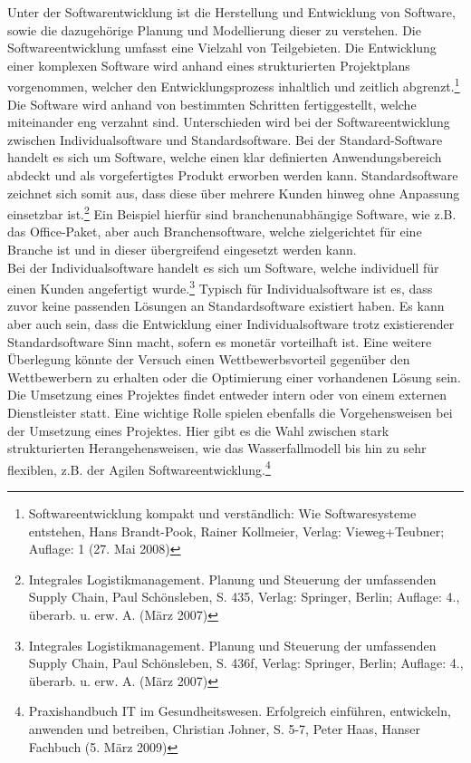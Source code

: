 Unter der Softwarentwicklung ist die Herstellung und Entwicklung von Software, sowie die dazugehörige Planung und Modellierung dieser zu verstehen.
Die Softwareentwicklung umfasst eine Vielzahl von Teilgebieten.
Die Entwicklung einer komplexen Software wird anhand eines strukturierten Projektplans vorgenommen, welcher den Entwicklungsprozess inhaltlich und zeitlich abgrenzt.\footnote{Softwareentwicklung kompakt und verständlich: Wie Softwaresysteme entstehen, Hans Brandt-Pook, Rainer Kollmeier, Verlag: Vieweg+Teubner; Auflage: 1 (27. Mai 2008)}
Die Software wird anhand von bestimmten Schritten fertiggestellt, welche miteinander eng verzahnt sind.
Unterschieden wird bei der Softwareentwicklung zwischen Individualsoftware und Standardsoftware.
Bei der Standard-Software handelt es sich um Software, welche einen klar definierten Anwendungsbereich abdeckt und als vorgefertigtes Produkt erworben werden kann.
Standardsoftware zeichnet sich somit aus, dass diese über mehrere Kunden hinweg ohne Anpassung einsetzbar ist.\footnote{Integrales Logistikmanagement. Planung und Steuerung der umfassenden Supply Chain, Paul Schönsleben, S. 435, Verlag: Springer, Berlin; Auflage: 4., überarb. u. erw. A. (März 2007)}
Ein Beispiel hierfür sind branchenunabhängige Software, wie z.B. das Office-Paket, aber auch Branchensoftware, welche zielgerichtet für eine Branche ist und in dieser übergreifend eingesetzt werden kann.\\
Bei der Individualsoftware handelt es sich um Software, welche individuell für einen Kunden angefertigt wurde.\footnote{Integrales Logistikmanagement. Planung und Steuerung der umfassenden Supply Chain, Paul Schönsleben, S. 436f, Verlag: Springer, Berlin; Auflage: 4., überarb. u. erw. A. (März 2007)}
Typisch für Individualsoftware ist es, dass zuvor keine passenden Lösungen an Standardsoftware existiert haben. 
Es kann aber auch sein, dass die Entwicklung einer Individualsoftware trotz existierender Standardsoftware Sinn macht, sofern es monetär vorteilhaft ist.
Eine weitere Überlegung könnte der Versuch einen Wettbewerbsvorteil gegenüber den Wettbewerbern zu erhalten oder die Optimierung einer vorhandenen Lösung sein.\\
Die Umsetzung eines Projektes findet entweder intern oder von einem externen Dienstleister statt.
Eine wichtige Rolle spielen ebenfalls die Vorgehensweisen bei der Umsetzung eines Projektes.
Hier gibt es die Wahl zwischen stark strukturierten Herangehensweisen, wie das Wasserfallmodell bis hin zu sehr flexiblen, z.B. der Agilen Softwareentwicklung.\footnote{Praxishandbuch IT im Gesundheitswesen. Erfolgreich einführen, entwickeln, anwenden und betreiben, Christian Johner, S. 5-7, Peter Haas, Hanser Fachbuch (5. März 2009)}\\
